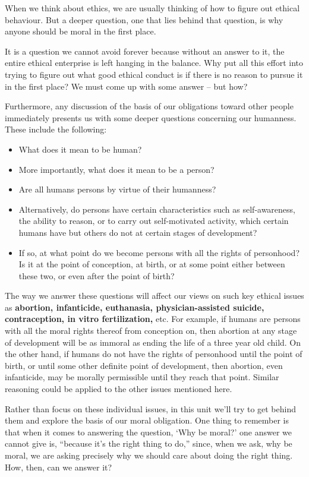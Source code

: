 \documentclass[
]{book}
\providecommand{\tightlist}{%
  \setlength{\itemsep}{0pt}\setlength{\parskip}{0pt}}
\begin{document}
When we think about ethics, we are usually thinking of how to figure out ethical behaviour. But a deeper question, one that lies behind that question, is why anyone should be moral in the first place.

It is a question we cannot avoid forever because without an answer to it, the entire ethical enterprise is left hanging in the balance. Why put all this effort into trying to figure out what good ethical conduct is if there is no reason to pursue it in the first place? We must come up with some answer -- but how?

Furthermore, any discussion of the basis of our obligations toward other people immediately presents us with some deeper questions concerning our humanness. These include the following:

\begin{itemize}
\tightlist
\item
  What does it mean to be human?
\item
  More importantly, what does it mean to be a person?
\item
  Are all humans persons by virtue of their humanness?
\item
  Alternatively, do persons have certain characteristics such as self-awareness, the ability to reason, or to carry out self-motivated activity, which certain humans have but others do not at certain stages of development?
\item
  If so, at what point do we become persons with all the rights of personhood? Is it at the point of conception, at birth, or at some point either between these two, or even after the point of birth?
\end{itemize}

The way we answer these questions will affect our views on such key ethical issues as \textbf{abortion, infanticide, euthanasia, physician-assisted suicide, contraception, in vitro fertilization,} etc. For example, if humans are persons with all the moral rights thereof from conception on, then abortion at any stage of development will be as immoral as ending the life of a three year old child. On the other hand, if humans do not have the rights of personhood until the point of birth, or until some other definite point of development, then abortion, even infanticide, may be morally permissible until they reach that point. Similar reasoning could be applied to the other issues mentioned here.

Rather than focus on these individual issues, in this unit we'll try to get behind them and explore the basis of our moral obligation. One thing to remember is that when it comes to answering the question, `Why be moral?' one answer we cannot give is, ``because it's the right thing to do,'' since, when we ask, why be moral, we are asking precisely why we should care about doing the right thing. How, then, can we answer it?
\end{document}
